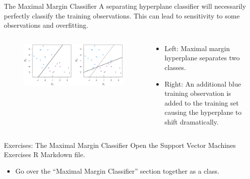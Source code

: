 \documentclass[
  ignorenonframetext,
  aspectratio=169,
]{beamer}
\providecommand{\tightlist}{%
  \setlength{\itemsep}{0pt}\setlength{\parskip}{0pt}}\usepackage{longtable,booktabs,array}
\begin{document}
\begin{frame}{The Maximal Margin Classifier}
\protect\hypertarget{the-maximal-margin-classifier-2}{}
A separating hyperplane classifier will necessarily perfectly classify
the training observations. This can lead to
\alert{sensitivity to some observations and overfitting}.

\begin{columns}[T]
\begin{column}{0.6\textwidth}
\begin{figure}

{\centering \includegraphics{images/margin_sensitivity.png}

}

\end{figure}
\end{column}

\begin{column}{0.4\textwidth}
\begin{itemize}
\item
  Left: Maximal margin hyperplane separates two classes.
\item
  Right: An additional blue training observation is added to the
  training set causing the hyperplane to shift dramatically.
\end{itemize}
\end{column}
\end{columns}
\end{frame}

\begin{frame}{Exercises: The Maximal Margin Classifier}
\protect\hypertarget{exercises-the-maximal-margin-classifier}{}
Open the Support Vector Machines Exercises R Markdown file.

\begin{itemize}
\tightlist
\item
  Go over the ``Maximal Margin Classifier'' section together as a class.
\end{itemize}
\end{frame}
\end{document}
